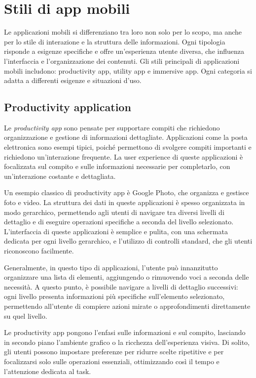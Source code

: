 \section{Stili di app mobili}
Le applicazioni mobili si differenziano tra loro non solo per lo scopo, ma anche per lo stile di interazione e la struttura delle informazioni. Ogni tipologia risponde a esigenze specifiche e offre un'esperienza utente diversa, che influenza l’interfaccia e l’organizzazione dei contenuti. Gli stili principali di applicazioni mobili includono: productivity app, utility app e immersive app. Ogni categoria si adatta a differenti esigenze e situazioni d’uso.

\subsection{Productivity application}
Le \textit{productivity app} sono pensate per supportare compiti che richiedono organizzazione e gestione di informazioni dettagliate. Applicazioni come la posta elettronica sono esempi tipici, poiché permettono di svolgere compiti importanti e richiedono un’interazione frequente. La user experience di queste applicazioni è focalizzata sul compito e sulle informazioni necessarie per completarlo, con un’interazione costante e dettagliata.

Un esempio classico di productivity app è Google Photo, che organizza e gestisce foto e video. La struttura dei dati in queste applicazioni è spesso organizzata in modo gerarchico, permettendo agli utenti di navigare tra diversi livelli di dettaglio e di eseguire operazioni specifiche a seconda del livello selezionato. L’interfaccia di queste applicazioni è semplice e pulita, con una schermata dedicata per ogni livello gerarchico, e l’utilizzo di controlli standard, che gli utenti riconoscono facilmente.

Generalmente, in questo tipo di applicazioni, l'utente può innanzitutto organizzare una lista di elementi, aggiungendo o rimuovendo voci a seconda delle necessità. A questo punto, è possibile navigare a livelli di dettaglio successivi: ogni livello presenta informazioni più specifiche sull'elemento selezionato, permettendo all’utente di compiere azioni mirate o approfondimenti direttamente su quel livello.

Le productivity app pongono l’enfasi sulle informazioni e sul compito, lasciando in secondo piano l’ambiente grafico o la ricchezza dell’esperienza visiva. Di solito, gli utenti possono impostare preferenze per ridurre scelte ripetitive e per focalizzarsi solo sulle operazioni essenziali, ottimizzando così il tempo e l’attenzione dedicata al task.

